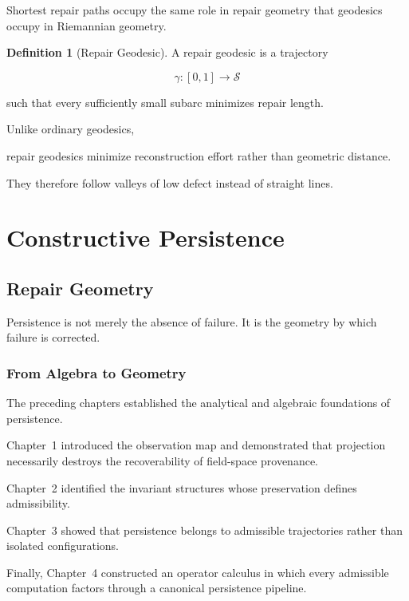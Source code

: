 \documentclass[11pt]{book}
\numberwithin{equation}{chapter}
\theoremstyle{definition}
\newtheorem{definition}{Definition}[chapter]
\theoremstyle{plain}
\begin{document}
Shortest repair paths occupy the same role in repair geometry that
geodesics occupy in Riemannian geometry.

\begin{definition}[Repair Geodesic]

A repair geodesic is a trajectory

\[
\gamma
:
[0,1]
\rightarrow
\mathcal S
\]

such that every sufficiently small subarc minimizes repair length.

\end{definition}

Unlike ordinary geodesics,

repair geodesics minimize reconstruction effort rather than geometric
distance.

They therefore follow valleys of low defect instead of straight lines.

\part{Constructive Persistence}

\chapter{Repair Geometry}

\epigraph{%
Persistence is not merely the absence of failure.
It is the geometry by which failure is corrected.
}{}

\section{From Algebra to Geometry}

The preceding chapters established the analytical and algebraic
foundations of persistence.

Chapter~1 introduced the observation map and demonstrated that
projection necessarily destroys the recoverability of field-space
provenance.

Chapter~2 identified the invariant structures whose preservation
defines admissibility.

Chapter~3 showed that persistence belongs to admissible trajectories
rather than isolated configurations.

Finally, Chapter~4 constructed an operator calculus in which every
admissible computation factors through a canonical persistence
pipeline.
\end{document}
